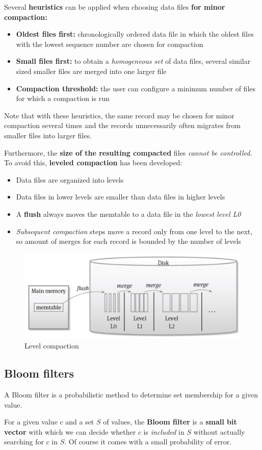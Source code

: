 Several \textbf{heuristics} can be applied when choosing data files \textbf{for minor compaction:}
\begin{itemize}
    \item \textbf{Oldest files first:} chronologically ordered data file in which the oldest files with the lowest sequence number are chosen for compaction
    \item \textbf{Small files first:} to obtain a \textit{homogeneous set} of data files, several similar sized smaller files are merged into one larger file
    \item \textbf{Compaction threshold:} the user can configure a minimum number of files for which a compaction is run
\end{itemize}
Note that with these heuristics, the same record may be chosen for minor compaction several times and the records unnecessarily often migrates from smaller files into larger files.

Furthermore, the \textbf{size of the resulting compacted} files \textit{cannot be controlled}. To avoid this, \textbf{leveled compaction} has been developed:
\begin{itemize}
    \item Data files are organized into levels
    \item Data files in lower levels are smaller than data files in higher levels
    \item A \textbf{flush} always moves the memtable to a data file in the \textit{lowest level L0}
    \item \textit{Subsequent compaction} steps move a record only from one level to the next, so amount of merges for each record is bounded by the number of levels
\end{itemize}

\begin{figure}[!hbp]
    \centering
    \includegraphics[width=0.70\linewidth]{images/AdvancedDataManagment/extensible_record_store/leveled_compaction.jpeg}
    \caption{Level compaction}
\end{figure}

\subsection{Bloom filters}
A Bloom filter is a probabilistic method to determine set membership for a given value.
\begin{tcolorbox}
For a given value \(c\) and a set \(S\) of values, the \textbf{Bloom filter} is a \textbf{small bit vector} with which we can decide whether \(c\) is \textit{included} in \(S\) without actually searching for \(c\) in \(S\). Of course it comes with a small probability of error.
\end{tcolorbox}

